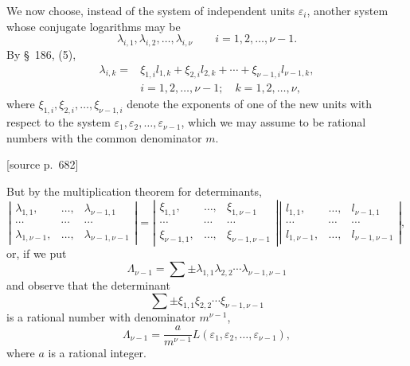 \documentclass[11pt]{article}
\newcommand{\srcpage}[1]{\par\medskip\noindent\textsf{[source p.~#1]}\par\smallskip}
\begin{document}
We now choose, instead of the system of independent units $\varepsilon_i$, another system whose conjugate logarithms may be
\begin{equation}
\lambda_{i,1},\lambda_{i,2},\ldots,\lambda_{i,\nu}
\qquad i=1,2,\ldots,\nu-1.
\tag{1}
\end{equation}
By \S~186, (5),
\begin{equation}
\begin{array}{rl}
\lambda_{i,k}={}&\xi_{1,i}l_{1,k}+\xi_{2,i}l_{2,k}+\cdots+\xi_{\nu-1,i}l_{\nu-1,k},\\[2pt]
&i=1,2,\ldots,\nu-1;\quad k=1,2,\ldots,\nu,
\end{array}
\tag{2}
\end{equation}
where $\xi_{1,i},\xi_{2,i},\ldots,\xi_{\nu-1,i}$ denote the exponents of one of the new units with respect to the system $\varepsilon_1,\varepsilon_2,\ldots,\varepsilon_{\nu-1}$, which we may assume to be rational numbers with the common denominator $m$.

\srcpage{682}
But by the multiplication theorem for determinants,
\begin{equation}
\left|\begin{array}{ccc}
\lambda_{1,1},&\ldots,&\lambda_{\nu-1,1}\\
\cdots&\cdots&\cdots\\
\lambda_{1,\nu-1},&\ldots,&\lambda_{\nu-1,\nu-1}
\end{array}\right|
=
\left|\begin{array}{ccc}
\xi_{1,1},&\ldots,&\xi_{1,\nu-1}\\
\cdots&\cdots&\cdots\\
\xi_{\nu-1,1},&\ldots,&\xi_{\nu-1,\nu-1}
\end{array}\right|
\left|\begin{array}{ccc}
l_{1,1},&\ldots,&l_{\nu-1,1}\\
\cdots&\cdots&\cdots\\
l_{1,\nu-1},&\ldots,&l_{\nu-1,\nu-1}
\end{array}\right|,
\tag{3}
\end{equation}
or, if we put
\[
\Lambda_{\nu-1}=\sum\pm\lambda_{1,1}\lambda_{2,2}\cdots\lambda_{\nu-1,\nu-1}
\]
and observe that the determinant
\[
\sum\pm\xi_{1,1}\xi_{2,2}\cdots\xi_{\nu-1,\nu-1}
\]
is a rational number with denominator $m^{\nu-1}$,
\begin{equation}
\Lambda_{\nu-1}=\frac{a}{m^{\nu-1}}L(\varepsilon_1,\varepsilon_2,\ldots,\varepsilon_{\nu-1}),
\tag{4}
\end{equation}
where $a$ is a rational integer.
\end{document}
